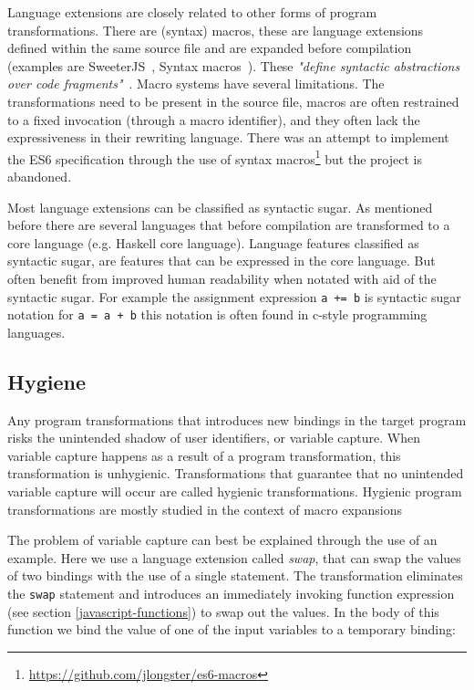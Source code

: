 Language extensions are closely related to other forms of program transformations. There are (syntax) macros\cite{Leavenworth1966}, these are language extensions defined within the same source file and are expanded before compilation (examples are SweeterJS~\cite{Disney2014}, Syntax macros~\cite{Weise1993}). These \textit{"define syntactic abstractions over code fragments"}~\cite{Bravenboer2004}. Macro systems have several limitations. The transformations need to be present in the source file, macros are often restrained to a fixed invocation (through a macro identifier), and they often lack the expressiveness in their rewriting language\cite{Bravenboer2004}. There was an attempt to implement the ES6 specification through the use of syntax macros\footnote{\url{https://github.com/jlongster/es6-macros}} but the project is abandoned.

Most language extensions can be classified as syntactic sugar. As mentioned before there are several languages that before compilation are transformed to a core language (e.g. Haskell core language).  Language features classified as syntactic sugar, are features that can be expressed in the core language. But often benefit from improved human readability when notated with aid of the syntactic sugar. For example the assignment expression \lstinline$a += b$ is syntactic sugar notation for \lstinline$a = a + b$ this notation is often found in c-style programming languages.

\subsection{Hygiene} \label{hygiene}
Any program transformations that introduces new bindings in the target program risks the unintended shadow of user identifiers, or variable capture. When variable capture happens as a result of a program transformation, this transformation is unhygienic. Transformations that guarantee that no unintended variable capture will occur are called hygienic transformations. Hygienic program transformations are mostly studied in the context of macro expansions~\cite{Herman2010a,Herman2010,Disney2014}

The problem of variable capture can best be explained through the use of an example. Here we use a language extension called \textit{swap}, that can swap the values of two bindings with the use of a single statement. The transformation eliminates the \lstinline$swap$ statement and introduces an immediately invoking function expression (see section \ref{javascript-functions}) to swap out the values. In the body of this function we bind the value of one of the input variables to a temporary binding:

